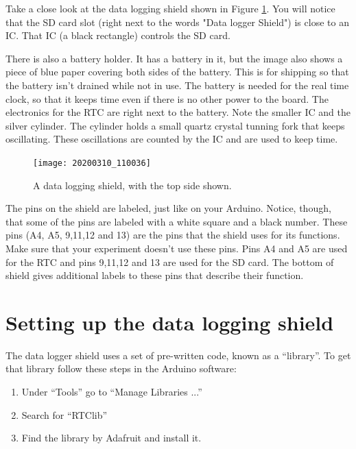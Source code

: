 Take a close look at the data logging shield shown in Figure 
\ref{fig:Data_Logger}. You will notice that the SD card slot (right next to 
the words "Data logger Shield") is close to an IC. That IC (a black rectangle) 
controls the SD card. 
	
There is also a battery holder. It has a battery in it, but the image also 
shows a piece of blue paper covering both sides of the battery. This is for 
shipping so that the battery isn't drained while not in use. The battery is 
needed for the real time clock, so that it keeps time even if there is no other 
power to the board. The electronics for the RTC are right next to the battery. 
Note the smaller IC and the silver cylinder. The cylinder holds a small quartz 
crystal tunning fork that keeps oscillating. These oscillations are counted by 
the IC and are used to keep time. 
\begin{figure}[htbp!] 
	\centering
	\texttt{[image: 20200310\_110036]}
	\caption[A data logging shield]{A data logging shield, with the top 
	side shown.}
	\label{fig:Data_Logger}
\end{figure}
	
The pins on the shield are labeled, just like on your Arduino. Notice, though, 
that some of the pins are labeled with a white square and a black number. 
These pins (A4, A5, 9,11,12 and 13) are the pins that the shield uses for its 
functions. Make sure that your experiment doesn't use these pins. Pins A4 and 
A5 are used for the RTC and pins 9,11,12 and 13 are used for the SD card. The 
bottom of shield gives additional labels to these pins that describe their 
function. 

\section{Setting up the data logging shield}
The data logger shield uses a set of pre-written code, known as a
``library''. To get that library follow these steps in the Arduino 
software:
\begin{enumerate}
	\item Under ``Tools'' go to ``Manage Libraries ...''
	\item Search for ``RTClib''
	\item Find the library by Adafruit and install it.
\end{enumerate}

